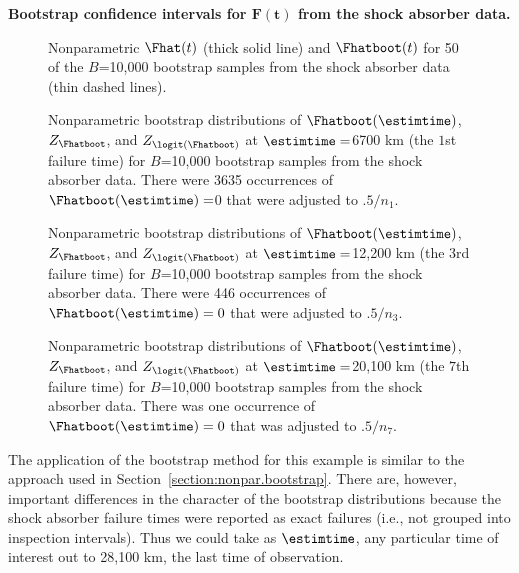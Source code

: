 \begin{example}
{\bf Bootstrap confidence intervals for $\boldsymbol{F(t)}$ from the shock
absorber data.} 
\label{example:shock.abs.boot.samples}
\begin{figure}
\caption{Nonparametric $\Fhat(t)$ (thick solid line)
and $\Fhatboot(t)$ for 50 of the $B$=10,000
bootstrap samples from the shock absorber data (thin dashed lines).}
\label{figure:shockabsB.boot.cdfplot.ps}
\end{figure}
\begin{figure}
\caption{Nonparametric bootstrap distributions of 
$\Fhatboot(\estimtime)$, $Z_{\Fhatboot}$, and
$Z_{\logit(\Fhatboot)}$ at $\estimtime=$6700
km (the $1$st failure time) for $B$=10,000
bootstrap samples from the shock absorber data.  There were 3635
occurrences of $\Fhatboot(\estimtime)=$0 that were adjusted to $.5/n_{1}$.}
\label{figure:shockabsB.cdfboot.t2.ps}
\end{figure}
\begin{figure}
\caption{Nonparametric bootstrap distributions of 
$\Fhatboot(\estimtime)$, $Z_{\Fhatboot}$, and
$Z_{\logit(\Fhatboot)}$ at $\estimtime=$12,200 km (the $3$rd failure time)
for $B$=10,000 bootstrap samples from the shock absorber data.  There
were 446 occurrences of $\Fhatboot(\estimtime)=0$ that were adjusted to
$.5/n_{3}$.}
\label{figure:shockabsB.cdfboot.t4.ps}
\end{figure}
\begin{figure}
\caption{Nonparametric bootstrap distributions of 
$\Fhatboot(\estimtime)$, $Z_{\Fhatboot}$, and
$Z_{\logit(\Fhatboot)}$ at $\estimtime=$20,100 km (the $7$th failure time)
for $B$=10,000 bootstrap samples from the shock absorber data.  There
was one occurrence of $\Fhatboot(\estimtime)=0$ that was adjusted to
$.5/n_{7}$.}
\label{figure:shockabsB.cdfboot.t8.ps}
\end{figure}
The application of the bootstrap method for this
example is similar to the approach used in
Section~\ref{section:nonpar.bootstrap}.  There are, however, important
differences in the character of the bootstrap distributions because
the shock absorber failure times were reported as exact failures (i.e.,
not grouped into inspection intervals). Thus we could take as $\estimtime$,
any particular time of interest out to 28,100 km, the last time of
observation.


\end{example}

